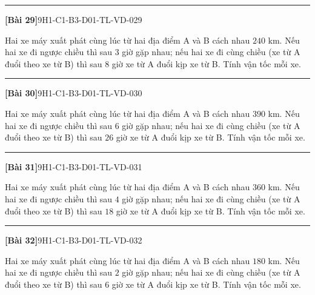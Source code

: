 \documentclass[12pt,a4paper]{article}
\newif\ifloigiai
\newenvironment{cauhoi}[2]{%
  \par\medskip\noindent\rule{\textwidth}{0.4pt}\par\nopagebreak
  \noindent\textbf{[#1]}\hfill{\scriptsize\ttfamily #2}\par\nopagebreak\smallskip}{\par}
\newcommand{\loigiai}[1]{\ifloigiai\par\smallskip\noindent\textit{Lời giải.} #1\par\fi}
\begin{document}
\begin{cauhoi}{Bài 29}{9H1-C1-B3-D01-TL-VD-029}
Hai xe máy xuất phát cùng lúc từ hai địa điểm A và B cách nhau $240$ km. Nếu hai xe đi ngược chiều thì sau $3$ giờ gặp nhau; nếu hai xe đi cùng chiều (xe từ A đuổi theo xe từ B) thì sau $8$ giờ xe từ A đuổi kịp xe từ B. Tính vận tốc mỗi xe.
\loigiai{Gọi vận tốc xe từ A là $x$ (km/h) và xe từ B là $y$ (km/h), $x>y>0$. Đi ngược chiều: $3(x+y)=240$, tức là $x+y=80$. Đi cùng chiều: $8(x-y)=240$, tức là $x-y=30$. Giải hệ ta được $x=55$, $y=25$ (thoả mãn). Vậy vận tốc xe từ A là 55 km/h, xe từ B là 25 km/h.}
\end{cauhoi}
\begin{cauhoi}{Bài 30}{9H1-C1-B3-D01-TL-VD-030}
Hai xe máy xuất phát cùng lúc từ hai địa điểm A và B cách nhau $390$ km. Nếu hai xe đi ngược chiều thì sau $6$ giờ gặp nhau; nếu hai xe đi cùng chiều (xe từ A đuổi theo xe từ B) thì sau $26$ giờ xe từ A đuổi kịp xe từ B. Tính vận tốc mỗi xe.
\loigiai{Gọi vận tốc xe từ A là $x$ (km/h) và xe từ B là $y$ (km/h), $x>y>0$. Đi ngược chiều: $6(x+y)=390$, tức là $x+y=65$. Đi cùng chiều: $26(x-y)=390$, tức là $x-y=15$. Giải hệ ta được $x=40$, $y=25$ (thoả mãn). Vậy vận tốc xe từ A là 40 km/h, xe từ B là 25 km/h.}
\end{cauhoi}
\begin{cauhoi}{Bài 31}{9H1-C1-B3-D01-TL-VD-031}
Hai xe máy xuất phát cùng lúc từ hai địa điểm A và B cách nhau $360$ km. Nếu hai xe đi ngược chiều thì sau $4$ giờ gặp nhau; nếu hai xe đi cùng chiều (xe từ A đuổi theo xe từ B) thì sau $18$ giờ xe từ A đuổi kịp xe từ B. Tính vận tốc mỗi xe.
\loigiai{Gọi vận tốc xe từ A là $x$ (km/h) và xe từ B là $y$ (km/h), $x>y>0$. Đi ngược chiều: $4(x+y)=360$, tức là $x+y=90$. Đi cùng chiều: $18(x-y)=360$, tức là $x-y=20$. Giải hệ ta được $x=55$, $y=35$ (thoả mãn). Vậy vận tốc xe từ A là 55 km/h, xe từ B là 35 km/h.}
\end{cauhoi}
\begin{cauhoi}{Bài 32}{9H1-C1-B3-D01-TL-VD-032}
Hai xe máy xuất phát cùng lúc từ hai địa điểm A và B cách nhau $180$ km. Nếu hai xe đi ngược chiều thì sau $2$ giờ gặp nhau; nếu hai xe đi cùng chiều (xe từ A đuổi theo xe từ B) thì sau $6$ giờ xe từ A đuổi kịp xe từ B. Tính vận tốc mỗi xe.
\loigiai{Gọi vận tốc xe từ A là $x$ (km/h) và xe từ B là $y$ (km/h), $x>y>0$. Đi ngược chiều: $2(x+y)=180$, tức là $x+y=90$. Đi cùng chiều: $6(x-y)=180$, tức là $x-y=30$. Giải hệ ta được $x=60$, $y=30$ (thoả mãn). Vậy vận tốc xe từ A là 60 km/h, xe từ B là 30 km/h.}
\end{cauhoi}
\end{document}
